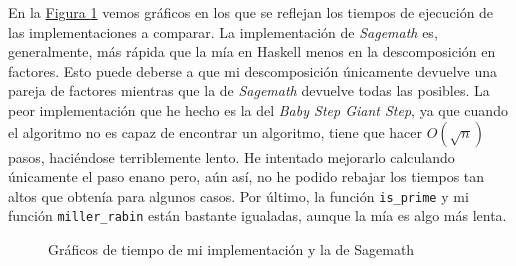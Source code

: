\documentclass[10pt,spanish]{article}
\begin{document}
En la \hyperref[graficas]{Figura \ref*{graficas}} vemos gráficos en los que se reflejan los tiempos de ejecución de las implementaciones a comparar. La implementación de \textit{\textcolor{rojo}{Sagemath}} es, generalmente, más rápida que la mía en Haskell menos en la descomposición en factores. Esto puede deberse a que mi descomposición únicamente devuelve una pareja de factores mientras que la de \textit{\textcolor{rojo}{Sagemath}} devuelve todas las posibles. La peor implementación que he hecho es la del \textit{\textcolor{rojo}{Baby Step Giant Step}}, ya que cuando el algoritmo no es capaz de encontrar un algoritmo, tiene que hacer $O(\sqrt{n})$ pasos, haciéndose terriblemente lento. He intentado mejorarlo calculando únicamente el paso enano pero, aún así, no he podido rebajar los tiempos tan altos que obtenía para algunos casos. Por último, la función \texttt{is\_prime} y mi función \texttt{miller\_rabin} están bastante igualadas, aunque la mía es algo más lenta.  

\begin{figure}
    \centering
    \caption{Gráficos de tiempo de mi implementación y la de Sagemath}
    \label{graficas}
\end{figure}
\end{document}
